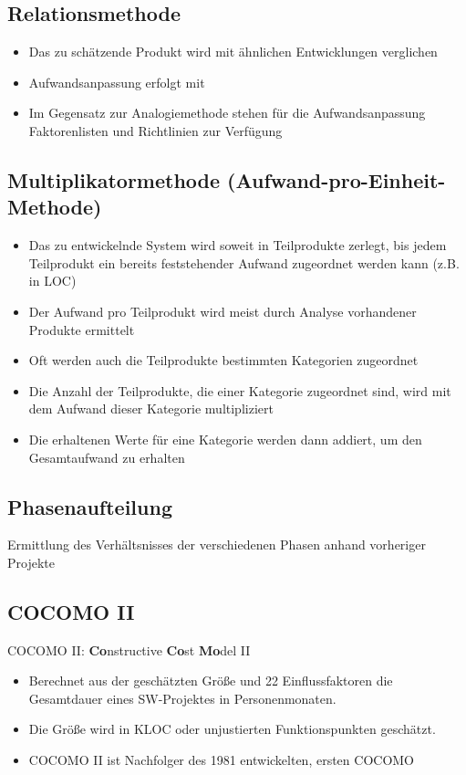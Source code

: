 \subsection{Relationsmethode}
\begin{itemize}
    \item Das zu schätzende Produkt wird mit ähnlichen Entwicklungen verglichen
    \item Aufwandsanpassung erfolgt mit 
    \item Im Gegensatz zur Analogiemethode stehen für die Aufwandsanpassung Faktorenlisten und Richtlinien zur Verfügung
\end{itemize}

\subsection{Multiplikatormethode (Aufwand-pro-Einheit-Methode)}
\begin{itemize}
    \item Das zu entwickelnde System wird soweit in Teilprodukte zerlegt, bis jedem Teilprodukt ein bereits feststehender Aufwand zugeordnet werden kann (z.B. in LOC)
    \item Der Aufwand pro Teilprodukt wird meist durch Analyse vorhandener Produkte ermittelt
    \item Oft werden auch die Teilprodukte bestimmten Kategorien zugeordnet
    \item Die Anzahl der Teilprodukte, die einer Kategorie zugeordnet sind, wird mit dem Aufwand dieser Kategorie multipliziert
    \item Die erhaltenen Werte für eine Kategorie werden dann addiert, um den Gesamtaufwand zu erhalten
\end{itemize}

\subsection{Phasenaufteilung}
Ermittlung des Verhältsnisses der verschiedenen Phasen anhand vorheriger Projekte

\subsection{COCOMO II}
COCOMO II: \textbf{Co}nstructive \textbf{Co}st \textbf{Mo}del II
\begin{itemize}
    \item Berechnet aus der geschätzten Größe und 22 Einflussfaktoren die Gesamtdauer eines SW-Projektes in Personenmonaten.
    \item Die Größe wird in KLOC oder unjustierten Funktionspunkten geschätzt.
    \item COCOMO II ist Nachfolger des 1981 entwickelten, ersten COCOMO
\end{itemize}

